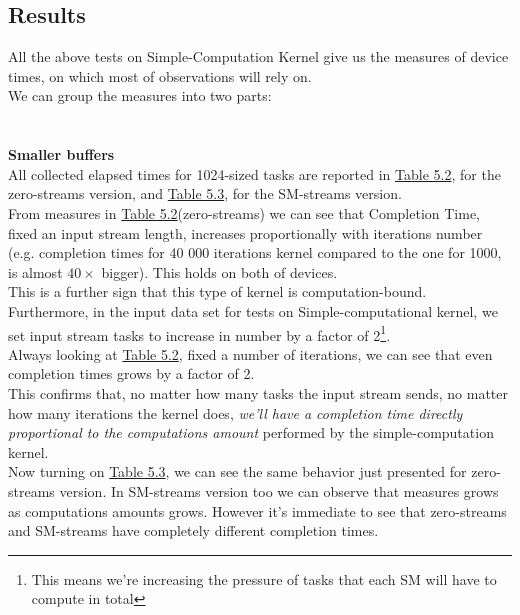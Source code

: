 \subsection{Results}
All the above tests on Simple-Computation Kernel give us the measures of device times, on which most of observations will rely on.\\
We can group the measures into two parts:\\\\\\
	{\large \textbf{Smaller buffers}}\\
	All collected elapsed times for 1024-sized tasks are reported in \hyperref[tab:cosavgszero]{Table 5.2}, for the zero-streams version, and \hyperref[tab:cosavgsSM]{Table 5.3}, for the SM-streams version.\\
	From measures in \hyperref[tab:cosavgszero]{Table 5.2}(zero-streams) we can see that Completion Time, fixed an input stream length, increases proportionally with iterations number (e.g. completion times for 40 000 iterations kernel compared to the one for 1000, is almost \(40\times\) bigger). This holds on both of devices.\\
	This is a further sign that this type of kernel is computation-bound.\\

	Furthermore, in the input data set for tests on Simple-computational kernel, we set input stream tasks to increase in number by a factor of 2\footnote{This means we're increasing the pressure of tasks that each SM will have to compute in total}.\\ 
	Always looking at \hyperref[tab:cosavgszero]{Table 5.2}, fixed a number of iterations, we can see that even completion times grows by a factor of 2.\\
	This confirms that, no matter how many tasks the input stream sends, no matter how many iterations the kernel does, \textit{we'll have a completion time directly proportional to the computations amount} performed by the simple-computation kernel.\\
	
	Now turning on \hyperref[tab:cosavgsSM]{Table 5.3}, we can see the same behavior just presented for zero-streams version. In SM-streams version too we can observe that measures grows as computations amounts grows. However it's immediate to see that zero-streams and SM-streams have completely different completion times.
			

